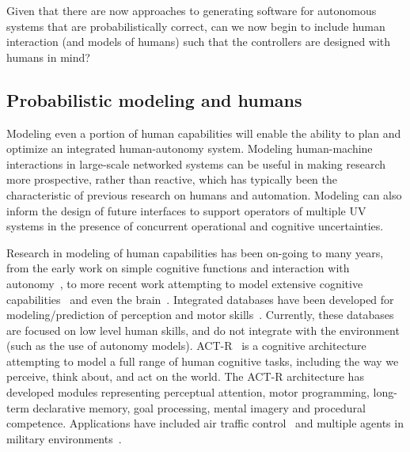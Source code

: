 Given that there are now approaches to generating software for autonomous systems that are probabilistically correct, can we now begin to include human interaction (and models of humans) such that the controllers are designed with humans in mind?

\subsection*{Probabilistic modeling and humans}

Modeling even a portion of human capabilities will enable the ability to plan and optimize an integrated human-autonomy system. Modeling human-machine interactions in large-scale networked systems can be useful in making research more prospective, rather than reactive, which has typically been the characteristic of previous research on humans and automation. Modeling can also inform the design of future interfaces to support operators of multiple UV systems in the presence of concurrent operational and cognitive uncertainties. 

Research in modeling of human capabilities has been on-going to many years, from the early work on simple cognitive functions and interaction with autonomy~\cite{Sheridan92}, to more recent work attempting to model extensive cognitive capabilities~\cite{anderson1997act} and even the brain~\cite{brain2013}. Integrated databases have been developed for modeling/prediction of perception and motor skills~\cite{epic,Kieras99a,Byrne03a,actrpm}. Currently, these databases are focused on low level human skills, and do not integrate with the environment (such as the use of autonomy models). ACT-R~\cite{anderson1997act} is a cognitive architecture attempting to model a full range of human cognitive tasks, including the way we perceive, think about, and act on the world. The ACT-R architecture has developed modules  representing perceptual attention, motor programming, long-term declarative memory, goal processing, mental imagery and procedural competence. Applications have included air traffic control~\cite{lebiere2001multi,taatgen2006modeling} and multiple agents in military environments~\cite{best2006cognitive}. 


